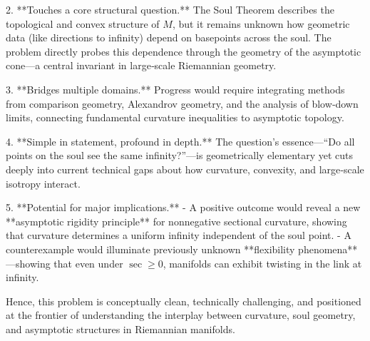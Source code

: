 2. **Touches a core structural question.**  
   The Soul Theorem describes the topological and convex structure of \(M\), but it remains unknown how geometric data (like directions to infinity) depend on basepoints across the soul. The problem directly probes this dependence through the geometry of the asymptotic cone—a central invariant in large‐scale Riemannian geometry.

3. **Bridges multiple domains.**  
   Progress would require integrating methods from comparison geometry, Alexandrov geometry, and the analysis of blow‐down limits, connecting fundamental curvature inequalities to asymptotic topology.

4. **Simple in statement, profound in depth.**  
   The question’s essence—“Do all points on the soul see the same infinity?”—is geometrically elementary yet cuts deeply into current technical gaps about how curvature, convexity, and large‐scale isotropy interact.

5. **Potential for major implications.**  
   - A positive outcome would reveal a new **asymptotic rigidity principle** for nonnegative sectional curvature, showing that curvature determines a uniform infinity independent of the soul point.  
   - A counterexample would illuminate previously unknown **flexibility phenomena**—showing that even under \(\sec\ge0\), manifolds can exhibit twisting in the link at infinity.

Hence, this problem is conceptually clean, technically challenging, and positioned at the frontier of understanding the interplay between curvature, soul geometry, and asymptotic structures in Riemannian manifolds.